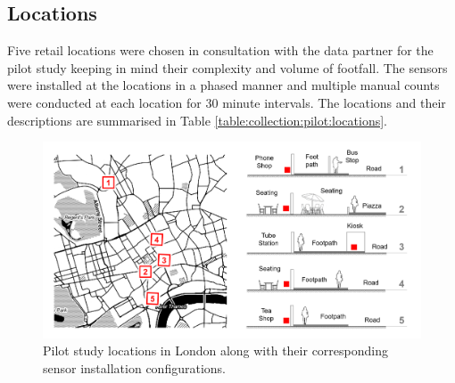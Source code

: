 \subsection{Locations}

Five retail locations were chosen in consultation with the data partner for the pilot study keeping in mind their complexity and volume of footfall.
The sensors were installed at the locations in a phased manner and multiple manual counts were conducted at each location for 30 minute intervals.
The locations and their descriptions are summarised in Table \ref{table:collection:pilot:locations}.

\begin{figure}
  \centering
  \includegraphics[trim={20 20 20 20},clip, width=\textwidth]{images/pilot-study-locations.png}
  \caption{Pilot study locations in London along with their corresponding sensor installation configurations.}
  \label{figure:collection:pilot:locations}
\end{figure}

